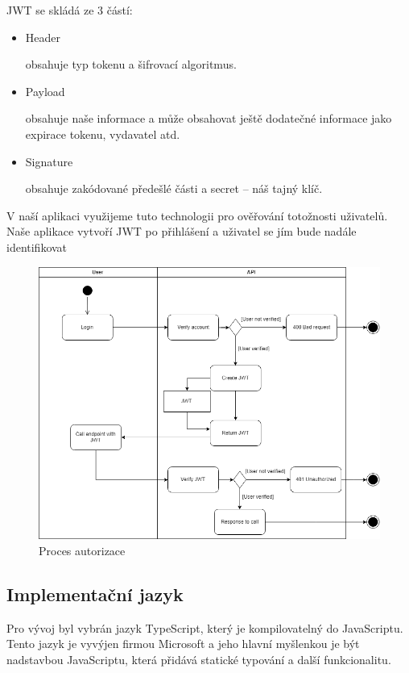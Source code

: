 \documentclass[thesis=B,czech]{FITthesis}[2012/06/26]
\begin{document}
            JWT se skládá ze 3 částí:
            \begin{itemize}
                \item Header
                    
                    obsahuje typ tokenu a šifrovací algoritmus.
                \item Payload
                    
                    obsahuje naše informace a může obsahovat ještě dodatečné informace jako expirace tokenu, vydavatel atd. %
                \item Signature
                    
                    obsahuje zakódované předešlé části a secret -- náš tajný klíč.
            \end{itemize}
             V naší aplikaci využijeme tuto technologii pro ověřování totožnosti uživatelů. Naše aplikace vytvoří JWT po přihlášení a uživatel se jím bude nadále identifikovat
            \begin{figure}[ht!]
                \includegraphics[scale=0.45]{Process_of_authentication}
                \caption{Proces autorizace}
            \end{figure}
        \subsection{Implementační jazyk}
            Pro vývoj byl vybrán jazyk TypeScript, který je kompilovatelný do JavaScriptu. Tento jazyk je vyvýjen firmou Microsoft a jeho hlavní myšlenkou je být nadstavbou JavaScriptu, která přidává statické typování a další funkcionalitu.
\end{document}
